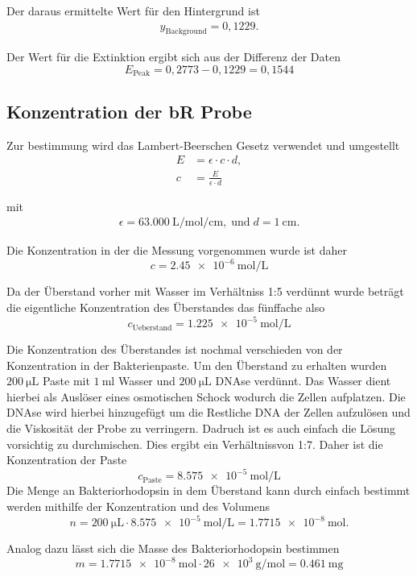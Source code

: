 Der daraus ermittelte Wert für den Hintergrund ist
\begin{align*}
    y_{\mathrm{Background}} = 0,1229.
\end{align*}

Der Wert für die Extinktion ergibt sich aus der Differenz der Daten 
\begin{equation}
    E_{\mathrm{Peak}} = 0,2773 - 0,1229 = 0,1544
\end{equation}


\subsection*{Konzentration der bR Probe}


Zur bestimmung wird das Lambert-Beerschen Gesetz verwendet und umgestellt
\begin{align*}
    E &= \epsilon \cdot c \cdot d,\\
    c &= \frac{E}{\epsilon \cdot d}
\end{align*}


 mit
\begin{align*}
   \epsilon = \SI{63.000}{\L\per\mole\per\cm}, \; \text{und} \; d = \SI{1}{\cm}.
 \end{align*}


 Die Konzentration in der die Messung vorgenommen wurde ist daher
 \begin{equation*}
    c = \SI{2,45e-6 }{\mole\per\L}
 \end{equation*}

 Da der Überstand vorher mit Wasser im Verhältniss 1:5 verdünnt wurde beträgt die eigentliche
 Konzentration des Überstandes das fünffache also
 \begin{equation*}
    c_{\mathrm{Ueberstand}} = \SI{1,225e-5}{\mole\per\L}
 \end{equation*}

Die Konzentration des Überstandes ist nochmal verschieden von der Konzentration in der Bakterienpaste.
Um den Überstand zu erhalten wurden $\SI{200}{\micro\L}$ Paste mit $\SI{1}{\ml}$ Wasser und $\SI{200}{\micro\L}$ DNAse verdünnt.
Das Wasser dient hierbei als Auslöser eines osmotischen Schock wodurch die Zellen aufplatzen.
Die DNAse wird hierbei hinzugefügt um die Restliche DNA der Zellen aufzulösen und die Viskosität der Probe zu verringern.
Dadruch ist es auch einfach die Lösung vorsichtig zu durchmischen.
Dies ergibt ein Verhältnissvon 1:7. Daher ist die Konzentration der Paste 
\begin{equation*}
    c_{\mathrm{Paste}} = \SI{8,575e-5}{\mole\per\L}
\end{equation*}
Die Menge an Bakteriorhodopsin in dem Überstand kann durch einfach bestimmt werden mithilfe der Konzentration und des Volumens
\begin{equation*}
    n = \SI{200}{\micro\L} \cdot \SI{8,575e-5}{\mole\per\L} = \SI{1,7715e-8}{\mole}.
\end{equation*}

Analog dazu lässt sich die Masse des Bakteriorhodopsin bestimmen
\begin{equation*}
    m = \SI{1,7715e-8}{\mole} \cdot \SI{26e3}{\g\per\mole} = \SI{0,461}{\milli\g}
\end{equation*}
